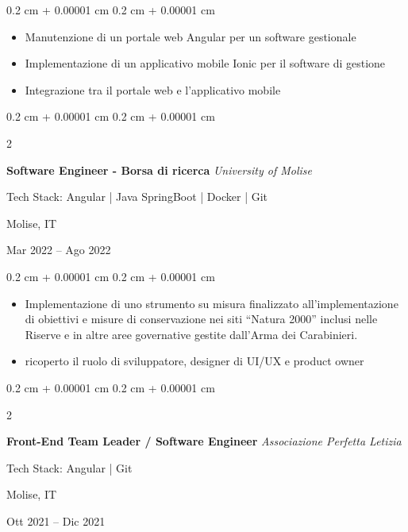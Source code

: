 \documentclass[10pt, letterpaper]{article}
\newenvironment{highlights}{
    \begin{itemize}[
        topsep=0.10 cm,
        parsep=0.10 cm,
        partopsep=0pt,
        itemsep=0pt,
        leftmargin=0.4 cm + 10pt
    ]
}{
    \end{itemize}
} %
\newenvironment{onecolentry}{
    \begin{adjustwidth}{
        0.2 cm + 0.00001 cm
    }{
        0.2 cm + 0.00001 cm
    }
}{
    \end{adjustwidth}
} %
\newenvironment{twocolentry}[2][]{
    \onecolentry
    \def\secondColumn{#2}
    \setcolumnwidth{\fill, 4.5 cm}
    \begin{paracol}{2}
}{
    \switchcolumn \raggedleft \secondColumn
    \end{paracol}
    \endonecolentry
} %
\begin{document}
        \vspace{0.10 cm}
        \begin{onecolentry}
            \begin{highlights}
                \item Manutenzione di un portale web Angular per un software gestionale
                \item Implementazione di un applicativo mobile Ionic per il software di gestione
                \item Integrazione tra il portale web e l'applicativo mobile
            \end{highlights}
        \end{onecolentry}


        \vspace{0.2 cm}
        
        \begin{twocolentry}{
        Molise, IT  
            
        Mar 2022 – Ago 2022}
            \textbf{Software Engineer - Borsa di ricerca} \textit{University of Molise}

            {\footnotesize Tech Stack: Angular | Java SpringBoot | Docker | Git}
        \end{twocolentry}

        \vspace{0.10 cm}
        \begin{onecolentry}
            \begin{highlights}
            \item Implementazione di uno strumento su misura finalizzato all'implementazione di obiettivi e misure di conservazione nei siti ``Natura 2000'' inclusi nelle Riserve e in altre aree governative gestite dall'Arma dei Carabinieri.
            \item ricoperto il ruolo di sviluppatore, designer di UI/UX e product owner
            \end{highlights}
        \end{onecolentry}


        \vspace{0.2 cm}

        \begin{twocolentry}{
        Molise, IT
            
        Ott 2021 – Dic 2021}
            \textbf{Front-End Team Leader / Software Engineer} \textit{Associazione Perfetta Letizia}

            {\footnotesize Tech Stack: Angular | Git }
        \end{twocolentry}
\end{document}
